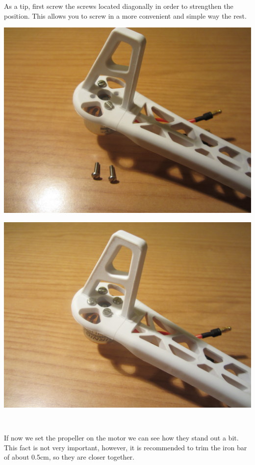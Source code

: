 \documentclass[12pt, a4paper,twoside]{tesi_upf}
\begin{document}
As a tip, first screw the screws located diagonally in order to strengthen the position. This allows you to screw in a more convenient and simple way the rest.
\\[12pt]

\begin{minipage}{0.5\textwidth}
  \centering
  \includegraphics[width=0.8\linewidth]{Images/Mounting/IMG_0449.jpg}
  \label{diagScrews}
\end{minipage}%
\begin{minipage}{0.5\textwidth}
  \centering
  \includegraphics[width=0.8\linewidth]{Images/Mounting/IMG_0450.jpg}
  \label{allScrews}
\end{minipage}
\\[12pt]
\clearpage

If now we set the propeller on the motor we can see how they stand out a bit. This fact is not very important, however, it is recommended to trim the iron bar of about 0.5cm, so they are closer together.
\\[12pt]
\end{document}
